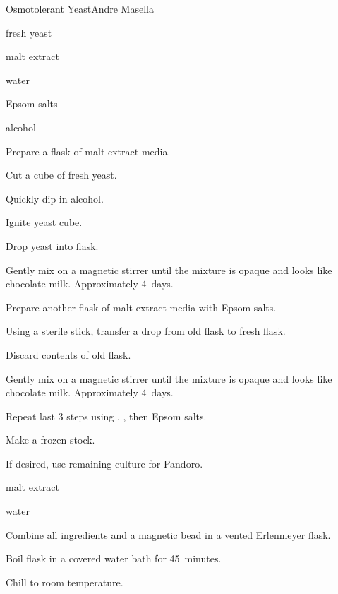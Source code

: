 \begin{recipe}{Osmotolerant Yeast}{Andre Masella}{}

\begin{ingredients}
\item fresh yeast
\item malt extract
\item water
\item Epsom salts
\item alcohol
\end{ingredients}

\begin{directions}
\item Prepare a flask of malt extract media.
\item Cut a cube of fresh yeast.
\item Quickly dip in alcohol.
\item Ignite yeast cube.
\item Drop yeast into flask.
\item Gently mix on a magnetic stirrer until the mixture is opaque and looks like chocolate milk. Approximately 4~days.
\item Prepare another flask of malt extract media with  Epsom salts.
\item Using a sterile stick, transfer a drop from old flask to fresh flask.
\item Discard contents of old flask.
\item Gently mix on a magnetic stirrer until the mixture is opaque and looks like chocolate milk. Approximately 4~days.
\item Repeat last 3 steps using , , then  Epsom salts.
\item Make a frozen stock.
\item If desired, use remaining culture for Pandoro.
\end{directions}

\begin{ingredients}
\item {} malt extract
\item {} water
\end{ingredients}

\begin{directions}
\item Combine all ingredients and a magnetic bead in a vented  Erlenmeyer flask.
\item Boil flask in a covered water bath for 45~minutes.
\item Chill to room temperature.
\end{directions}
\end{recipe}
